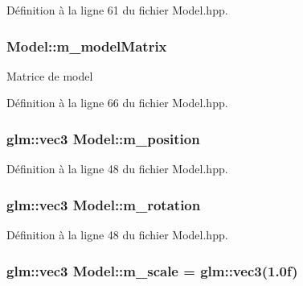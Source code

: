 Définition à la ligne 61 du fichier Model.\+hpp.

\hypertarget{classModel_a415a19bd8f5afaf29a40ddc02496b15f}{
\subsubsection[{m\+\_\+model\+Matrix}]{\setlength{\rightskip}{0pt plus 5cm}Model\+::m\+\_\+model\+Matrix\hspace{0.3cm}{\ttfamily [protected]}}}\label{classModel_a415a19bd8f5afaf29a40ddc02496b15f}
{\ttfamily Matrice} de model 

Définition à la ligne 66 du fichier Model.\+hpp.

\hypertarget{classModel_af1de9a151d77a2a7c9448fc796c2aee1}{
\subsubsection[{m\+\_\+position}]{\setlength{\rightskip}{0pt plus 5cm}glm\+::vec3 Model\+::m\+\_\+position\hspace{0.3cm}{\ttfamily [protected]}}}\label{classModel_af1de9a151d77a2a7c9448fc796c2aee1}


Définition à la ligne 48 du fichier Model.\+hpp.

\hypertarget{classModel_a5cacbaf83f7abedb413670a877ca0342}{
\subsubsection[{m\+\_\+rotation}]{\setlength{\rightskip}{0pt plus 5cm}glm\+::vec3 Model\+::m\+\_\+rotation\hspace{0.3cm}{\ttfamily [protected]}}}\label{classModel_a5cacbaf83f7abedb413670a877ca0342}


Définition à la ligne 48 du fichier Model.\+hpp.

\hypertarget{classModel_abc23ecdbd0ec986ed2ccd00fe20b817a}{
\subsubsection[{m\+\_\+scale}]{\setlength{\rightskip}{0pt plus 5cm}glm\+::vec3 Model\+::m\+\_\+scale = glm\+::vec3(1.\+0f)\hspace{0.3cm}{\ttfamily [protected]}}}\label{classModel_abc23ecdbd0ec986ed2ccd00fe20b817a}


